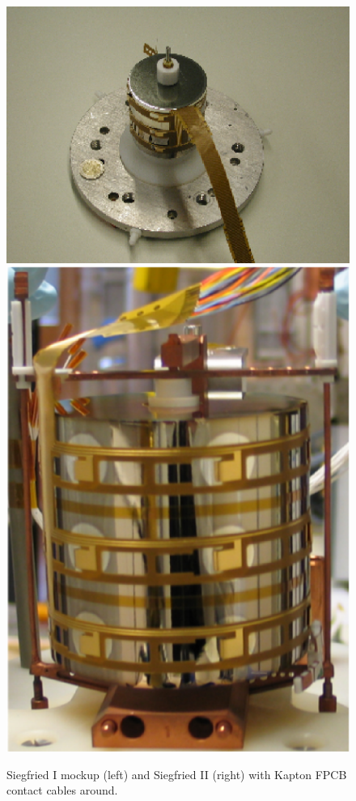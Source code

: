 \begin{figure}[tbhp]
  \centering
  \includegraphics[height=0.25\textheight]{SiegfriedI}\hfil
  \includegraphics[height=0.25\textheight]{SiegfriedII}
\caption{Siegfried I mockup (left) and Siegfried II (right) with Kapton FPCB contact cables around.}
\label{fig:tt:sies}
\end{figure}

